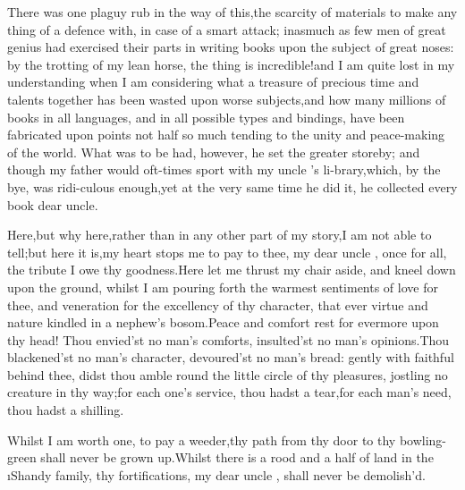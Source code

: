 \documentclass[twoside]{article}
\begin{document}
There was one plaguy rub in the way of this,\tsh the
scarcity of materials to make any thing of a defence with, in
case
of a smart attack; inasmuch as few men of great genius had
exercised their parts in writing books upon the subject of\break 
great noses: by the trotting of my lean horse, the thing is
incredible!\@  and I am quite lost in my understanding when I am
considering what a treasure of precious time and talents
together has been wasted upon worse subjects,\tsk and how many
millions of books in all languages, and in all possible types and
bindings, have been fabricated upon points not half so much
tending to the unity and peace-making of the world.  What was to
be had, however, he set the greater store\break by; and though my
father would oft-times sport with my uncle \toby's
li-\break brary,\tsk which, by the bye, was ridi-\break culous enough,\tsk yet
at the very same time he did it, he collected every book
dear uncle.\tsh

Here,\tsh but why here,\tsh rather than in any
other part of my story,\tsh I am not able to
tell;\tsh but here it is,\tsh my heart stops me to
pay to\break
thee, my dear uncle \toby, once for all, the tribute I
owe thy goodness.\tsh Here\break
let me thrust my chair aside, and kneel\break
down upon the ground, whilst I am\break
pouring forth the warmest sentiments\break
of love for thee, and veneration for\break
the excellency of thy character, that\break
ever virtue and nature kindled in a
nephew’s bosom.\tsh Peace and comfort rest for evermore upon thy
head!\tsk\break
Thou envied’st no man’s comforts,\tsh\break
insulted’st no man’s opinions.\tsh Thou\break
blackened’st no man’s character,\tsh\break
devoured’st no man’s bread: gently\break
with faithful \trim behind thee, didst\break
thou amble round the little circle of\break
thy pleasures, jostling no creature in\break
thy way;\tsk for each one’s service,\break
thou hadst a tear,\tsk for each man’s\break
need, thou hadst a shilling.

Whilst I am worth one, to pay a\break
weeder,\tsk thy path from thy door to\break
thy bowling-green shall never be grown\break
up.\tsh Whilst there is a rood and a\break
half of land in the \i{Shandy} family, thy\break
fortifications, my dear uncle \toby, shall\break
never be demolish’d.
\end{document}
